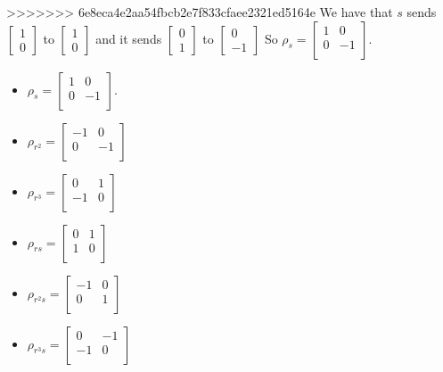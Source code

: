 \documentclass[]{article}
\begin{document}
>>>>>>> 6e8eca4e2aa54fbcb2e7f833cfaee2321ed5164e
We have that $s$ sends $
\begin{bmatrix}
	1\\
	0
\end{bmatrix}
$
to 
$
\begin{bmatrix}
	1\\
	0
\end{bmatrix}
$
and it sends 
$
\begin{bmatrix}
	0\\
	1
\end{bmatrix}
$
to
$
\begin{bmatrix}
	0\\
	-1
\end{bmatrix}
$
So $\rho_s =
\begin{bmatrix}
	1 & 0 \\
	0 & -1\\
\end{bmatrix}
$.
\begin{itemize}
	\item $\rho_s =
	\begin{bmatrix}
		1 & 0 \\
		0 & -1\\
	\end{bmatrix}
	$.
	\item $\rho_{r^2} = 
	\begin{bmatrix}
		-1 & 0 \\
		0 & -1\\
	\end{bmatrix}
	$
	\item $\rho_{r^3} = 
	\begin{bmatrix}
		0 & 1 \\
		-1 & 0\\
	\end{bmatrix}
	$
	\item $\rho_{rs} = 
	\begin{bmatrix}
		0 & 1 \\
		1 & 0\\
	\end{bmatrix}
	$
	\item $\rho_{r^2s} = 
	\begin{bmatrix}
		-1 & 0 \\
		0 & 1\\
	\end{bmatrix}
	$
	\item $\rho_{r^3s} = 
	\begin{bmatrix}
		0 & -1 \\
		-1 & 0\\
	\end{bmatrix}
	$
\end{itemize}
\end{document}
